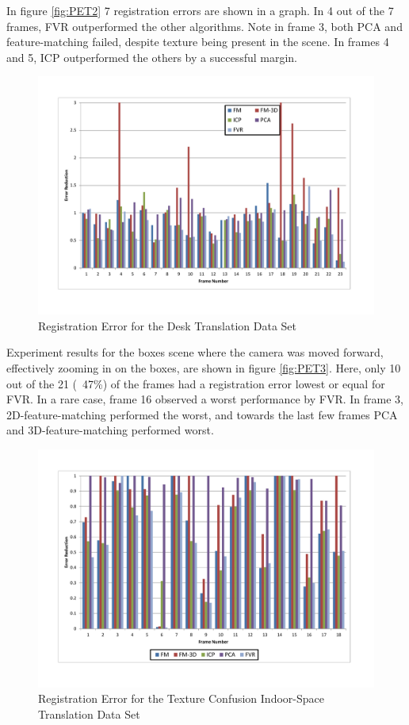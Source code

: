 In figure \ref{fig:PET2} 7 registration errors are shown in a graph. In 4 out of the 7 frames, FVR outperformed the other algorithms. Note in frame 3, both PCA and feature-matching failed, despite texture being present in the scene. In frames 4 and 5, ICP outperformed the others by a successful margin. 

\begin{figure}[t]
\centering
\includegraphics[width=6.0in]{images/results/Desk_Texture_Translation}
\caption{Registration Error for the Desk Translation Data Set}
\label{fig:PET4}
\end{figure}

Experiment results for the boxes scene where the camera was moved forward, effectively zooming in on the boxes, are shown in figure \ref{fig:PET3}. Here, only 10 out of the 21 (~47\%) of the frames had a registration error lowest or equal for FVR. In a rare case, frame 16 observed a worst performance by FVR. In frame 3, 2D-feature-matching performed the worst, and towards the last few frames PCA and 3D-feature-matching performed worst.

\begin{figure}[t]
\centering
\includegraphics[width=6.0in]{images/results/IndoorSpace_texture_confusion_translation}
\caption{Registration Error for the Texture Confusion Indoor-Space Translation Data Set}
\label{fig:PET5}
\end{figure}

